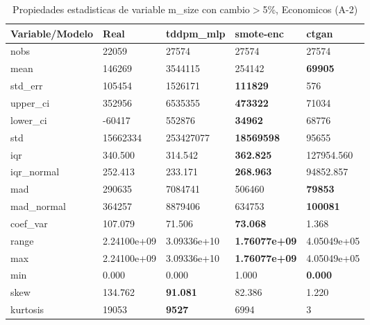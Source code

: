 \begin{table}[H]
\centering
\fontsize{8}{14}\selectfont
\caption{Propiedades estadisticas de variable m\_size con cambio\ensuremath{>}5\%, Economicos (A-2)}
\label{table-stats-economicos-a-2-m_size-short}
\begin{tabular}{|l|m{10em}|m{10em}|m{10em}|m{10em}|}
\hline
 \rowcolor[gray]{0.8}
Variable/Modelo & Real & tddpm\_mlp & smote-enc & ctgan \\
\hline nobs & 22059 & 27574 & 27574 & 27574 \\
\hline mean & 146269 & \cellcolor[rgb]{0.9, 0.54, 0.52} 3544115 & 254142 & \bfseries 69905 \\
\hline std\_err & 105454 & \cellcolor[rgb]{0.9, 0.54, 0.52} 1526171 & \bfseries 111829 & 576 \\
\hline upper\_ci & 352956 & \cellcolor[rgb]{0.9, 0.54, 0.52} 6535355 & \bfseries 473322 & 71034 \\
\hline lower\_ci & -60417 & \cellcolor[rgb]{0.9, 0.54, 0.52} 552876 & \bfseries 34962 & 68776 \\
\hline std & 15662334 & \cellcolor[rgb]{0.9, 0.54, 0.52} 253427077 & \bfseries 18569598 & 95655 \\
\hline iqr & 340.500 & 314.542 & \bfseries 362.825 & \cellcolor[rgb]{0.9, 0.54, 0.52} 127954.560 \\
\hline iqr\_normal & 252.413 & 233.171 & \bfseries 268.963 & \cellcolor[rgb]{0.9, 0.54, 0.52} 94852.857 \\
\hline mad & 290635 & \cellcolor[rgb]{0.9, 0.54, 0.52} 7084741 & 506460 & \bfseries 79853 \\
\hline mad\_normal & 364257 & \cellcolor[rgb]{0.9, 0.54, 0.52} 8879406 & 634753 & \bfseries 100081 \\
\hline coef\_var & 107.079 & 71.506 & \bfseries 73.068 & \cellcolor[rgb]{0.9, 0.54, 0.52} 1.368 \\
\hline range & 2.24100e+09 & \cellcolor[rgb]{0.9, 0.54, 0.52} 3.09336e+10 & \bfseries 1.76077e+09 & 4.05049e+05 \\
\hline max & 2.24100e+09 & \cellcolor[rgb]{0.9, 0.54, 0.52} 3.09336e+10 & \bfseries 1.76077e+09 & 4.05049e+05 \\
\hline min & 0.000 & 0.000 & \cellcolor[rgb]{0.9, 0.54, 0.52} 1.000 & \bfseries 0.000 \\
\hline skew & 134.762 & \bfseries 91.081 & 82.386 & \cellcolor[rgb]{0.9, 0.54, 0.52} 1.220 \\
\hline kurtosis & 19053 & \bfseries 9527 & 6994 & \cellcolor[rgb]{0.9, 0.54, 0.52} 3 \\

\end{tabular}
\end{table}
